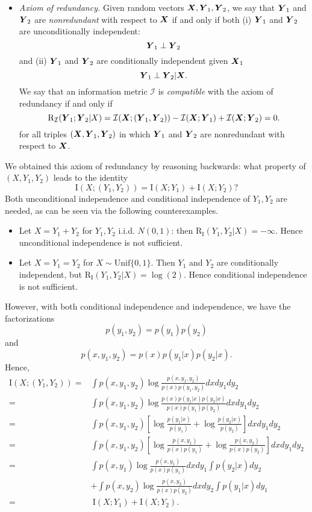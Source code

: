 \documentclass[12pt]{article}
\begin{document}
\begin{itemize}
\item \emph{Axiom of redundancy.}  
Given random vectors $\boldsymbol{X}, \boldsymbol{Y}_1, \boldsymbol{Y}_2$, we say that $\boldsymbol{Y}_1$ and
$\boldsymbol{Y}_2$ are \emph{nonredundant} with respect to $\boldsymbol{X}$ if and only if both (i) $\boldsymbol{Y}_1$ and $\boldsymbol{Y}_2$ are unconditionally independent:
\[\boldsymbol{Y}_1 \perp \boldsymbol{Y}_2\]
and (ii) $\boldsymbol{Y}_1$ and $\boldsymbol{Y}_2$ are conditionally independent given $\boldsymbol{X}_1$
\[\boldsymbol{Y}_1 \perp \boldsymbol{Y}_2 | \boldsymbol{X}.\]
We say that an information metric $\mathcal{I}$ is \emph{compatible} with the axiom of redundancy if and only if
\[
\text{R}_{\mathcal{I}}(\boldsymbol{Y}_1;\boldsymbol{Y}_2|X) = \mathcal{I}(\boldsymbol{X}; (\boldsymbol{Y}_1, \boldsymbol{Y}_2)) - \mathcal{I}(\boldsymbol{X}; \boldsymbol{Y}_1) + \mathcal{I}(\boldsymbol{X}; \boldsymbol{Y}_2) = 0.
\]
for all triples $(\boldsymbol{X}, \boldsymbol{Y}_1, \boldsymbol{Y}_2)$ in which $\boldsymbol{Y}_1$ and $\boldsymbol{Y}_2$ are
nonredundant with respect to $\boldsymbol{X}$.
\end{itemize}

We obtained this axiom of redundancy by reasoning backwards: what
property of $(X, Y_1, Y_2)$ leads to the identity
\[
\text{I}(X; (Y_1, Y_2)) = \text{I}(X; Y_1) + \text{I}(X; Y_2)?
\]
Both unconditional independence and conditional independence of $Y_1,
Y_2$ are needed, as can be seen via the following counterexamples.
\begin{itemize}
\item 
Let $X = Y_1 + Y_2$ for $Y_1, Y_2$ i.i.d. $N(0,1)$: then
$\text{R}_{\text{I}}(Y_1,Y_2|X) = -\infty$.  Hence unconditional
independence is not sufficient.
\item 
Let $X=Y_1=Y_2$ for $X \sim \text{Unif}\{0, 1\}$.  Then $Y_1$ and
$Y_2$ are conditionally independent, but
$\text{R}_{\text{I}}(Y_1,Y_2|X) = \log(2)$.  Hence conditional
independence is not sufficient.
\end{itemize}
However, with both conditional independence and independence, we have the factorizations
\[
p(y_1,y_2) = p(y_1) p(y_2)
\]
and
\[
p(x, y_1, y_2) = p(x) p(y_1|x) p(y_2|x).
\]
Hence,
\begin{align*}
\text{I}(X; (Y_1, Y_2)) =& \int p(x, y_1, y_2) \log \frac{p(x, y_1, y_2)}{p(x) p(y_1,y_2)} dx dy_1 dy_2
\\=& \int p(x, y_1, y_2) \log \frac{p(x) p(y_1|x) p(y_2|x)}{p(x) p(y_1) p(y_2)} dx dy_1 dy_2
\\=& \int p(x, y_1, y_2) \left[ \log \frac{p(y_1|x)}{p(y_1)} + \log \frac{p(y_2|x)}{p(y_2)} \right] dx dy_1 dy_2
\\=& \int p(x, y_1, y_2) \left[ \log \frac{p(x, y_1)}{p(x)p(y_1)} + \log \frac{p(x,y_2)}{p(x)p(y_2)} \right] dx dy_1 dy_2
\\=& \int p(x, y_1) \log \frac{p(x, y_1)}{p(x)p(y_1)} dx dy_1 \int p(y_2|x) dy_2 
\\&+ \int p(x, y_2) \log \frac{p(x,y_2)}{p(x)p(y_2)} dx dy_2 \int p(y_1|x) dy_1
\\=& \ \text{I}(X; Y_1) + \text{I}(X; Y_2).
\end{align*}
\end{document}
